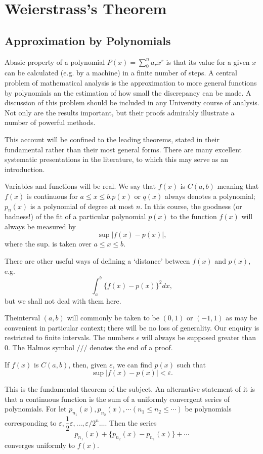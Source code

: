 \chapter{Weierstrass's Theorem}\label{chap1}

\section{Approximation by Polynomials}\label{chap1:sec1}

A\pageoriginale basic property of a polynomial  $ P (x) = \sum \limits_{0}^{n} a_r
x^r $ is that its value for a given $x$  can be calculated  (e.g. by
a machine) in a finite number of steps. A central problem  of
mathematical  analysis is the approximation to more general functions
by polynomials an the estimation of how small the discrepancy can be
made. A discussion of this problem should be included in any
University course of analysis. Not only are the results important, but
their proofs admirably illustrate a number of powerful methods. 

This account will be confined to the leading theorems, stated in their
fundamental rather than their most general forms. There are many
excellent systematic presentations in the literature, to which this
may serve as an introduction. 

Variables and functions will be real. We say that  $ f (x) $ is $ C (
a,b) $ meaning that $ f (x) $ is continuous for  $ a \leq x \leq b.
p (x) $ or $ q (x) $ always denotes a polynomial; $ p_n (x) $ is a
polynomial of degree at most $n$. In this course, the goodness (or
badness!) of the fit of  a particular polynomial $ p (x) $ to the
function $ f (x) $ will always be measured by  
$$
\sup | f (x) - p (x) |,
$$ 
where the sup. is taken over $ a \leq x \leq b $.

There are other useful ways of defining a `distance' between $ f (x) $
and $ p (x) $,  e.g. 
$$
\int^{b}_{a} \big \{f (x) - p (x) \big \}^2 dx, 
$$
but we shall not deal with them here.

The\pageoriginale interval $(a, b)$ will commonly be taken to be $(0,1)$ or $(
-1, 1)$ as may be convenient in particular context; there will be no
loss of generality. Our enquiry is restricted to finite intervals. The
numbers $\epsilon$ will always be supposed greater than $0$. The Halmos symbol
$///$ denotes the end of a proof.  

\begin{theorem}[Weierstrass 1885]\label{chap1:sec1:thm1}%
   If $f (x)$ is  $ C (a, b) $, then, given
    $ \varepsilon $, we can find $ p (x) $ such that 
  $$
  \sup | f (x) - p (x) | < \varepsilon.
  $$
  
  This is the fundamental theorem of the subject. An alternative
  statement of it is that a continuous  function is the sum of a
  uniformly convergent series of polynomials. For let $ p_{n_{1}} (x), 
  p_{n_{2}} (x), \cdots (n_1 \leq n_2 \leq \cdots) $ be polynomials
  corresponding to $ \varepsilon, \dfrac{1}{2} \varepsilon,  \ldots, 
  \varepsilon / 2^n \ldots$. Then the series  
  $$
  p_{n_{1}} (x) + \big \{p_{n_{2}} (x) - p_{n_{1}} (x) \big \} + \cdots  
  $$
  converges uniformly to $ f (x) $.
\end{theorem}

